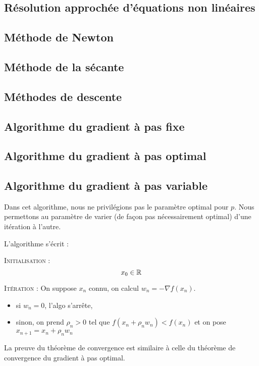 \subsection{Résolution approchée d'équations non linéaires}
\subsection{Méthode de Newton}



\subsection{Méthode de la sécante}
\subsection{Méthodes de descente}
\subsection{Algorithme du gradient à pas fixe}
\subsection{Algorithme du gradient à pas optimal}



\subsection{Algorithme du gradient à pas variable}

Dans cet algorithme, nous ne privilégions pas le paramètre optimal pour $p$. Nous permettons au paramètre de varier (de façon pas nécessairement optimal) d'une itération à l'autre.

L'algorithme s'écrit :

\textsc{Initialisation :}
\[ x_0 \in \mathbb{R} \]

\textsc{Itération :}
On suppose $x_n$ connu, on calcul $w_n=-\nabla f(x_n)$.
\begin{itemize}
\item si $w_n=0$, l'algo s'arrête,
\item sinon, on prend $\rho_n>0$ tel que $f(x_n+\rho_nw_n)<f(x_n)$ et on pose $x_{n+1}=x_n+\rho_nw_n$
\end{itemize}

La preuve du théorème de convergence est similaire à celle du théorème de convergence du gradient à pas optimal.

